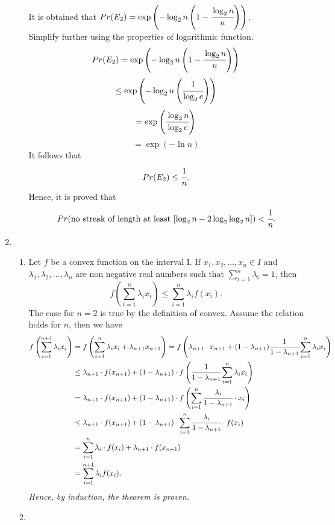 \documentclass{article}
\begin{document}
\begin{enumerate}
\begin{enumerate}
            It is obtained that \( Pr(E_2) = \exp\left(-\log_2 n \left(1 - \cfrac{\log_2 n}{n}\right)\right) \).\\
            Simplify further using the properties of logarithmic function.
            \[
                Pr(E_2) = \exp\left(-\log_2 n \left(1 - \cfrac{\log_2 n}{n}\right)\right)
            \]
            \[
                \leq \exp\left(-\log_2 n \left(\cfrac{1}{\log_2 e}\right)\right)
            \]
            \[
                = \exp\left(\cfrac{\log_2 n}{\log_2 e}\right)
            \]
            \[
                = \exp(-\ln n)
            \]
            It follows that
            \[
                Pr(E_2) \leq \cfrac{1}{n}.
            \]
            Hence, it is proved that
            \[
                Pr(\text{no streak of length at least } [\log_2 n - 2\log_2 \log_2 n]) < \cfrac{1}{n}.
            \]
    \end{enumerate}

\newpage
\item 
    \begin{enumerate}
    \item 
        Let \(f\) be a convex function on the interval I. If \(x_1, x_2, \ldots, x_n \in I\) and \(\lambda_1, \lambda_2, \ldots, \lambda_n\) are non negative real numbers such that \(\sum_{i=1}^{n} \lambda_i = 1\), then
        \[
            f\left(\sum_{i=1}^{n} \lambda_i x_i\right) \leq \sum_{i=1}^{n} \lambda_i f(x_i).
        \]
        The case for \(n = 2\) is true by the definition of convex. Assume the relation holds for \(n\), then we have
        \begin{align*}
            f\left(\sum_{i=1}^{n+1} \lambda_i x_i\right) &= f\left(\sum_{i=1}^{n} \lambda_i x_i + \lambda_{n+1}x_{n+1}\right)
            = f\left(\lambda_{n+1}\cdot x_{n+1} + (1 - \lambda_{n+1}) \cfrac{1}{1 - \lambda_{n+1}}\sum_{i=1}^{n} \lambda_i x_i\right)\\
            &\leq \lambda_{n+1}\cdot f(x_{n+1}) + (1 - \lambda_{n+1})\cdot f\left(\cfrac{1}{1 - \lambda_{n+1}}\sum_{i=1}^{n} \lambda_i x_i\right)\\
            &= \lambda_{n+1}\cdot f(x_{n+1}) + (1 - \lambda_{n+1})\cdot f\left(\sum_{i=1}^{n} \cfrac{\lambda_i}{1 - \lambda_{n+1}}\cdot x_i\right)\\
            &\leq \lambda_{n+1}\cdot f(x_{n+1}) + (1 - \lambda_{n+1})\cdot \sum_{i=1}^{n} \cfrac{\lambda_i}{1 - \lambda_{n+1}}\cdot f(x_i)\\
            &= \sum_{i=1}^{n} \lambda_i\cdot f(x_i) + \lambda_{n+1}\cdot f(x_{n+1})\\
            &= \sum_{i=1}^{n+1} \lambda_i f(x_i).
        \end{align*} 
        \textit{Hence, by induction, the theorem is proven.}\\
    \item 
        
    \end{enumerate}
\end{enumerate}
\end{document}

